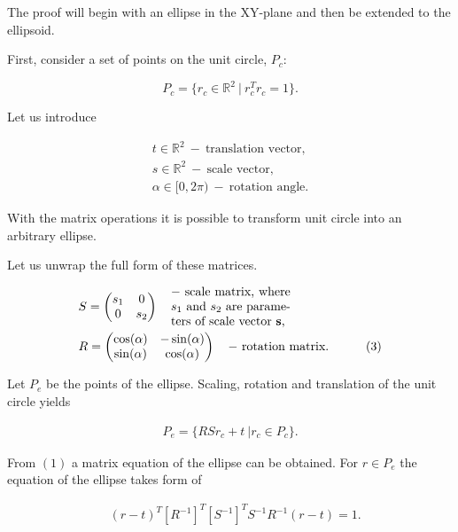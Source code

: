The proof will begin with an ellipse in the XY-plane and then be extended to the ellipsoid.

First, consider a set of points on the unit circle, $P_c$:

\begin{equation}
 P_c = \{ r_c \in \mathbb{R}^2 \ | \ r_c^Tr_c = 1\}. \tag{1}
\end{equation}

Let us introduce

\begin{align*}
  & t \in \mathbb{R}^2 \ - \ \text{translation vector,} \\ 
  & s \in \mathbb{R}^2 \ - \ \text{scale vector,} \\
  & \alpha \in [0, 2 \pi) \ - \ \text{rotation angle.} & \tag{2}
\end{align*}

With the matrix operations it is possible to transform unit circle into an arbitrary ellipse.

Let us unwrap the full form of these matrices.

\begin{align*}
  & S = \begin{pmatrix}
    s_1 & 0\\
    0 & s_2
  \end{pmatrix}
  \quad \parbox{0.28\textwidth}{ $-$ scale matrix, where $s_1$ and $s_2$ are parameters of scale vector $\textbf{s}$,} \\
  & R = \begin{pmatrix}
    \cos(\alpha) & -\sin(\alpha) \\
    \sin(\alpha) &  \cos(\alpha)
  \end{pmatrix}
  \quad \text{$-$ rotation matrix.} & \tag{3}
\end{align*}

Let $P_e$ be the points of the ellipse.
Scaling, rotation and translation of the unit circle yields

\begin{align}
 P_e = \{RSr_c + t \ |  r_c \in P_c\}. \tag{4}
\end{align}

From $(1)$ a matrix equation of the ellipse can be obtained.
For $r \in P_e$ the equation of the ellipse takes form of

\begin{align}
  & (r-t)^T [R^{-1}]^T [S^{-1}]^T  S^{-1}R^{-1}(r - t) = 1. \tag{5}
\end{align}

